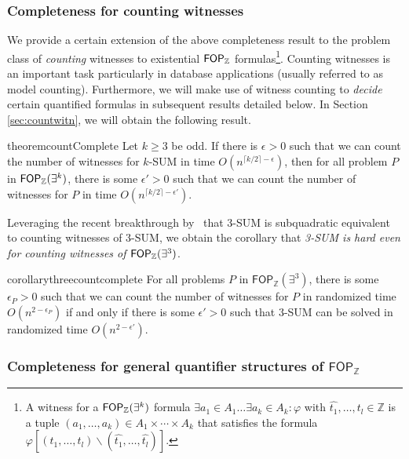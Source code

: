 \subsubsection{Completeness for counting witnesses}
We provide a certain extension of the above completeness result to the problem class of \emph{counting} witnesses to existential $\mathsf{FOP}_{\mathbb{Z}}$ formulas\footnote{A witness for a $\mathsf{FOP}_{\mathbb{Z}}(\exists^k)$ formula $\exists a_1 \in A_1 \dots \exists a_k \in A_k: \varphi$ with $\hat{t_1}, \dots, \hat{t_l} \in \mathbb{Z}$ is a tuple $(a_1,\dots, a_k)\in A_1\times \cdots \times A_k$ that satisfies the formula $\varphi[(t_1,\dots,t_l) \backslash (\hat{t_1},\dots,\hat{t_l})]$.}. Counting witnesses is an important task particularly in database applications (usually referred to as model counting). Furthermore, we will make use of witness counting to \emph{decide} certain quantified formulas in subsequent results detailed below. In Section \ref{sec:countwitn}, we will obtain the following result. 

\begin{restatable}{theorem}{countComplete}
	Let $k\geq3$ be odd. If there is $\epsilon > 0$ such that we can count the number of witnesses for $k$-SUM in time $O(n^{\lceil k/2 \rceil -\epsilon})$, then for all problem $P$ in $\mathsf{FOP}_{\mathbb{Z}}(\exists^k)$, there is some $\epsilon'> 0$ such that we can count the number of witnesses for $P$ in time $O(n^{\lceil k/2 \rceil -\epsilon'})$.
	\label{thm:counting-witnesses}
\end{restatable}

Leveraging the recent breakthrough by~\cite{DBLP:journals/corr/abs-2303-14572} that 3-SUM is subquadratic equivalent to counting witnesses of 3-SUM, we obtain the corollary that \emph{3-SUM is hard even for counting witnesses of $\mathsf{FOP}_{\mathbb{Z}}(\exists^3)$}.


\begin{restatable}{corollary}{threecountcomplete}
	For all problems $P$ in $\mathsf{FOP}_{\mathbb{Z}}(\exists^3)$, there is some $\epsilon_P >0$ such that we can count the number of witnesses for $P$ in randomized time $O(n^{2-\epsilon_P})$ if and only if there is some $\epsilon' > 0$ such that
    $3$-SUM can be solved in randomized time $O(n^{2-\epsilon'})$. 
\label{Count3COMP}
\end{restatable}


\subsubsection{Completeness for general quantifier structures of $\mathsf{FOP}_{\mathbb{Z}}$ }

